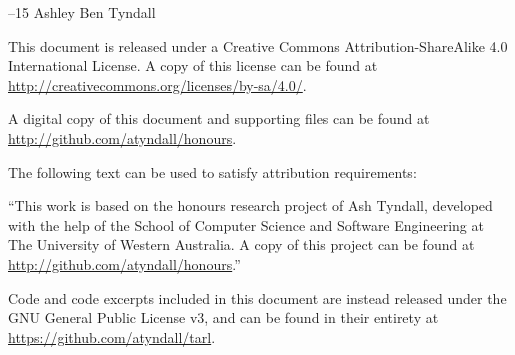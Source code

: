 \documentclass{../cshonours}
\title{\thetitle}
\author{\theauthor}
\begin{document}
\newcommand{\mainfile}{} %

\maketitle

\begin{abstract}
This is the abstract.
\end{abstract}

\newpage
\null
\vfill 
\noindent{\fontsize{40pt}{1em}\selectfont \ccbysa}

\null

\noindent\textcopyright\xspace 2014--15 Ashley Ben Tyndall

\noindent This document is released under a Creative Commons Attribution-ShareAlike 4.0 International License. A copy of this license can be found at \\ \url{http://creativecommons.org/licenses/by-sa/4.0/}.

\noindent A digital copy of this document and supporting files can be found at \\ \url{http://github.com/atyndall/honours}. %

\noindent The following text can be used to satisfy attribution requirements:

\noindent ``This work is based on the honours research project of Ash Tyndall,  developed with the help of the School of Computer Science and Software Engineering at The University of Western Australia. A copy of this project can be found at \\ \url{http://github.com/atyndall/honours}.''
	
\noindent Code and code excerpts included in this document are instead released under the GNU General Public License v3, and can be found in their entirety at \\ \url{https://github.com/atyndall/tarl}.

\newpage
\end{document}
